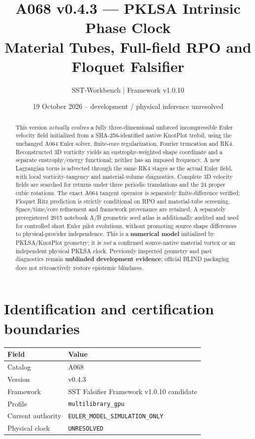 \documentclass[11pt,a4paper]{article}
\title{A068 v0.4.3 --- PKLSA Intrinsic Phase Clock\\Material Tubes, Full-field RPO and Floquet Falsifier}
\author{SST-Workbench | Framework v1.0.10}
\date{19 October 2026 -- development / physical inference unresolved}
\begin{document}
\maketitle
\begin{abstract}
This version \emph{actually evolves} a fully three-dimensional unforced incompressible Euler velocity field initialized from a SHA-256-identified native KnotPlot trefoil, using the unchanged A064 Euler solver, finite-core regularization, Fourier truncation and RK4. Reconstructed 3D vorticity yields an enstrophy-weighted shape coordinate and a separate enstrophy/energy functional; neither has an imposed frequency. A new Lagrangian torus is advected through the same RK4 stages as the actual Euler field, with local vorticity-tangency and material-volume diagnostics. Complete 3D velocity fields are searched for returns under three periodic translations and the 24 proper cubic rotations. The exact A064 tangent operator is separately finite-difference verified; Floquet Ritz prediction is strictly conditional on RPO and material-tube screening. Space/time/core refinement and framework provenance are retained. A separately preregistered 2015 notebook A/B geometric seed atlas is additionally audited and used for controlled short Euler pilot evolutions, without promoting source shape differences to physical-provider independence. This is a \textbf{numerical model} initialized by PKLSA/KnotPlot geometry; it is \emph{not} a confirmed source-native material vortex or an independent physical PKLSA clock. Previously inspected geometry and past diagnostics remain \textbf{unblinded development evidence}; official BLIND packaging does not retroactively restore epistemic blindness.
\end{abstract}

\section{Identification and certification boundaries}
\begin{tabular}{ll}
\toprule Field & Value\\\midrule
Catalog & A068\\ Version & v0.4.3\\ Framework & SST Falsifier Framework v1.0.10 candidate\\
Profile & \texttt{multilibrary\_gpu}\\ Current authority & \texttt{EULER\_MODEL\_SIMULATION\_ONLY}\\
Physical clock & \texttt{UNRESOLVED}\\ \bottomrule
\end{tabular}
\end{document}
